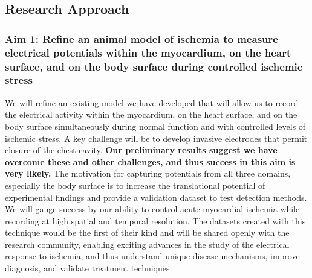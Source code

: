 %
\subsection{Research Approach}
\label{sec:appr}

\subsubsection{Aim 1: Refine an animal model of ischemia to measure electrical potentials within the myocardium, on the heart surface, and on the body surface during controlled ischemic stress }
We will refine an existing model we have developed
\cite{RSM:Ara2016,BLZ:Zen2018a} that will allow us to record
the electrical activity within the myocardium, on the heart surface, and on
the body surface simultaneously during normal function and with controlled
levels of ischemic stress. A key challenge will be to develop invasive
electrodes that permit closure of the chest cavity. \textbf{Our
  preliminary results suggest we have overcome these and other challenges, and
  thus success in this aim is very likely.} The motivation for
 capturing potentials from all three domains, especially the body surface is
 to increase the translational potential of experimental findings and
 provide a validation dataset to test detection methods.
We will gauge success by our ability to control acute
myocardial ischemia while recording at high spatial and temporal
resolution. The datasets created with this technique would be the first of
their kind and will be shared openly with the research community, enabling
 exciting advances in the study of the electrical response to ischemia, and
 thus understand unique disease mechanisms, improve diagnosis, and validate
 treatment techniques.


